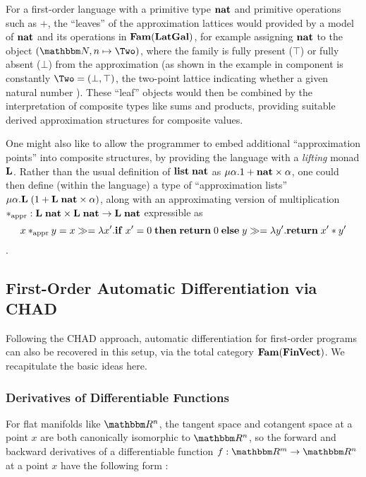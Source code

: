 For a first-order language with a primitive type $\mathbf{nat}$ and primitive operations such as $+$, the
``leaves'' of the approximation lattices would provided by a model of $\mathbf{nat}$ and its operations in
$\mathbf{Fam}(\mathbf{LatGal})$, for example assigning $\mathbf{nat}$ to the object $(\Nat,n \mapsto \Two)$, where the family is
fully present ($\top$) or fully absent ($\bot$) from the approximation (as shown in the example in component
is constantly $\Two = (\bot,\top)$, the two-point lattice indicating whether a given natural number
). These ``leaf'' objects would then be combined by the interpretation of composite types
like sums and products, providing suitable derived approximation structures for composite values.

One might also like to allow the programmer to embed additional ``approximation points'' into composite
structures, by providing the language with a \emph{lifting} monad $\mathbf{L}$. Rather than the usual definition
of $\mathbf{list}\;\mathbf{nat}$ as $\mu\alpha.1 + \mathbf{nat} \times \alpha$, one could then define (within the
language) a type of ``approximation lists'' $\mu\alpha.\mathbf{L}\;(1 + \mathbf{L}\;\mathbf{nat} \times \alpha)$, along
with an approximating version of multiplication $*_{\text{appr}}: \mathbf{L}\;\mathbf{nat} \times \mathbf{L}\;\mathbf{nat}
\to \mathbf{L}\;\mathbf{nat}$ expressible as
\[x *_{\text{appr}} y = {x}\gg={\lambda x'.\mathbf{if}\;x' =
0\;\mathbf{then}\;\mathbf{return}\;0\;\mathbf{else}\;{y}\gg={\lambda y'.\mathbf{return}\;x' * y'}}\].


\subsection{First-Order Automatic Differentiation via CHAD}

Following the CHAD approach, automatic differentiation for first-order programs can also be recovered in this
setup, via the total category $\mathbf{Fam}(\mathbf{FinVect})$. We recapitulate the basic ideas here.

\subsubsection{Derivatives of Differentiable Functions}

For flat manifolds like $\RR^n$, the tangent space and cotangent space at a point $x$ are both canonically
isomorphic to $\RR^n$, so the forward and backward derivatives of a differentiable function $f: \RR^m \to
\RR^n$ at a point $x$ have the following form :

